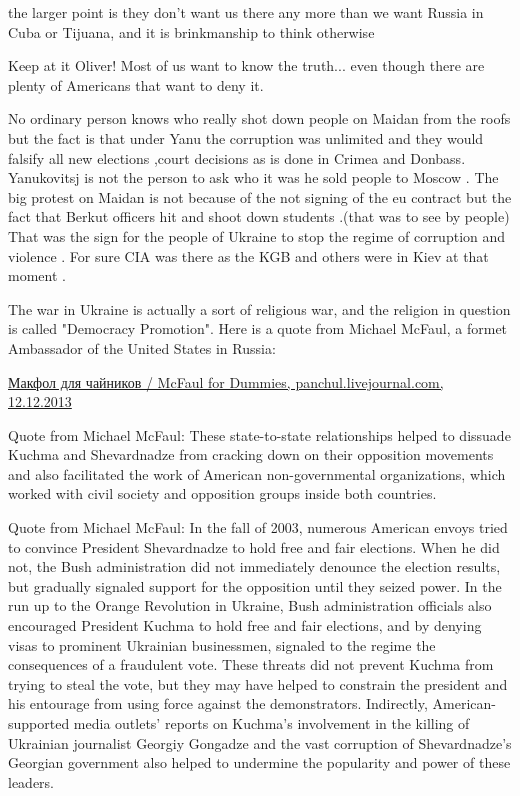 \begin{itemize}

the larger point is they don't want us there any more than we want Russia in
Cuba or Tijuana, and it is brinkmanship to think otherwise


Keep at it Oliver! Most of us want to know the truth... even though there are
plenty of Americans that want to deny it.


No ordinary person knows who really shot down people on Maidan from the roofs
but the fact is that under Yanu the corruption was unlimited and they would
falsify all new elections ,court decisions as is done in Crimea and Donbass.
Yanukovitsj is not the person to ask who it was he sold people to Moscow . The
big protest on Maidan is not because of the not signing of the eu contract but
the fact that Berkut officers hit and shoot down students .(that was to see by
people) That was the sign for the people of Ukraine to stop the regime of
corruption and violence . For sure CIA was there as the KGB and others were in
Kiev at that moment .


The war in Ukraine is actually a sort of religious war, and the religion in
question is called "Democracy Promotion". Here is a quote from Michael McFaul,
a formet Ambassador of the United States in Russia:

\href{http://panchul.livejournal.com/316473.html}{%
Макфол для чайников / McFaul for Dummies, panchul.livejournal.com, 12.12.2013%
}

Quote from Michael McFaul: These state-to-state relationships helped to
dissuade Kuchma and Shevardnadze from cracking down on their opposition
movements and also facilitated the work of American non-governmental
organizations, which worked with civil society and opposition groups inside
both countries.

Quote from Michael McFaul: In the fall of 2003, numerous American envoys tried
to convince President Shevardnadze to hold free and fair elections. When he did
not, the Bush administration did not immediately denounce the election results,
but gradually signaled support for the opposition until they seized power. In
the run up to the Orange Revolution in Ukraine, Bush administration officials
also encouraged President Kuchma to hold free and fair elections, and by
denying visas to prominent Ukrainian businessmen, signaled to the regime the
consequences of a fraudulent vote. These threats did not prevent Kuchma from
trying to steal the vote, but they may have helped to constrain the president
and his entourage from using force against the demonstrators. Indirectly,
American-supported media outlets’ reports on Kuchma’s involvement in the
killing of Ukrainian journalist Georgiy Gongadze and the vast corruption of
Shevardnadze’s Georgian government also helped to undermine the popularity and
power of these leaders.


\end{itemize}

